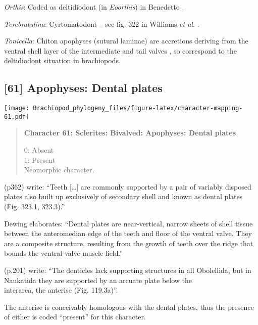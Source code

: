 \documentclass[openany]{book}
\theoremstyle{definition}
\theoremstyle{definition}
\theoremstyle{definition}
\theoremstyle{remark}
\begin{document}
\hypertarget{Orthis-coding-60}{}
\emph{Orthis}: Coded as deltidiodont (in \emph{Eoorthis}) in Benedetto
\citeyearpar{Benedetto2009iChaniella}.

\hypertarget{Terebratulina-coding-60}{}
\emph{Terebratulina}: Cyrtomatodont -- see fig. 322 in Williams \emph{et
al}. \citeyearpar{Williams2000LinguliformeaCraniiformea}.

\hypertarget{Tonicella-coding-60}{}
\emph{Tonicella}: Chiton apophyses (sutural laminae) are accretions
deriving from the ventral shell layer of the intermediate and tail
valves \citep{Schwabe2010}, so correspond to the deltidiodont situation
in brachiopods.

\subsection*{{[}61{]} Apophyses: Dental
plates}\label{apophyses-dental-plates}

\texttt{[image: Brachiopod\_phylogeny\_files/figure-latex/character-mapping-61.pdf]}

\begin{quote}
\textbf{Character 61: Sclerites: Bivalved: Apophyses: Dental plates}

0: Absent\\
1: Present\\
Neomorphic character.
\end{quote}

\citet{Williams1997Introduction} (p362) write: ``Teeth {[}\ldots{}{]}
are commonly supported by a pair of variably disposed plates also built
up exclusively of secondary shell and known as dental plates (Fig.
323.1, 323.3).''

Dewing \citeyearpar{Dewing2001Hingemodifications} elaborates: ``Dental
plates are near-vertical, narrow sheets of shell tissue between the
anteromedian edge of the teeth and floor of the ventral valve. They are
a composite structure, resulting from the growth of teeth over the ridge
that bounds the ventral-valve muscle field.''

\citet{Williams2000LinguliformeaCraniiformea} (p.201) write: ``The
denticles lack supporting structures in all Obolellida, but in Naukatida
they are supported by an arcuate plate below the\\
interarea, the anterise (Fig. 119.3a)''.

The anterise is conceivably homologous with the dental plates, thus the
presence of either is coded ``present'' for this character.
\end{document}
